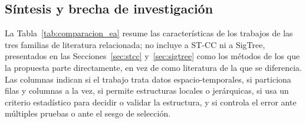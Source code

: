 \subsection{Síntesis y brecha de investigación}
\label{sec:ea_sintesis}

La Tabla~\ref{tab:comparacion_ea} resume las características de los
trabajos de las tres familias de literatura relacionada; no incluye a
\ac{ST-CC} ni a SigTree, presentados en las Secciones~\ref{sec:stcc}
y~\ref{sec:sigtree} como los métodos de los que la propuesta parte directamente, en vez de
como literatura de la que se diferencia. Las columnas indican si el
trabajo trata datos espacio-temporales, si particiona filas y columnas a la
vez, si permite estructuras locales o jerárquicas, si usa un criterio
estadístico para decidir o validar la estructura, y si controla el error
ante múltiples pruebas o ante el sesgo de selección.

